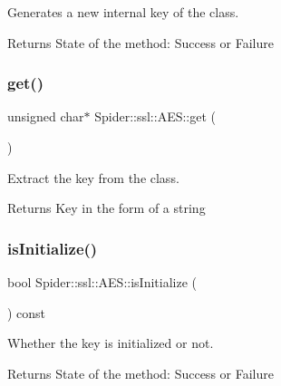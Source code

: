 Generates a new internal key of the class. 

\begin{DoxyReturn}{Returns}
State of the method\+: Success or Failure 
\end{DoxyReturn}
\mbox{\label{class_spider_1_1ssl_1_1_a_e_s_af29f6f29119e34fcf27605ed85a3460d}} 
\subsubsection{\texorpdfstring{get()}{get()}}
{\footnotesize\ttfamily unsigned char$\ast$ Spider\+::ssl\+::\+A\+E\+S\+::get (\begin{DoxyParamCaption}{ }\end{DoxyParamCaption})}



Extract the key from the class. 

\begin{DoxyReturn}{Returns}
Key in the form of a string 
\end{DoxyReturn}
\mbox{\label{class_spider_1_1ssl_1_1_a_e_s_a93e682bc36f5a52d75289fd43c2404f6}} 
\subsubsection{\texorpdfstring{is\+Initialize()}{isInitialize()}}
{\footnotesize\ttfamily bool Spider\+::ssl\+::\+A\+E\+S\+::is\+Initialize (\begin{DoxyParamCaption}{ }\end{DoxyParamCaption}) const}



Whether the key is initialized or not. 

\begin{DoxyReturn}{Returns}
State of the method\+: Success or Failure 
\end{DoxyReturn}
\mbox{\label{class_spider_1_1ssl_1_1_a_e_s_a46a15236249277adc1b4b1961985d2bf}} 

